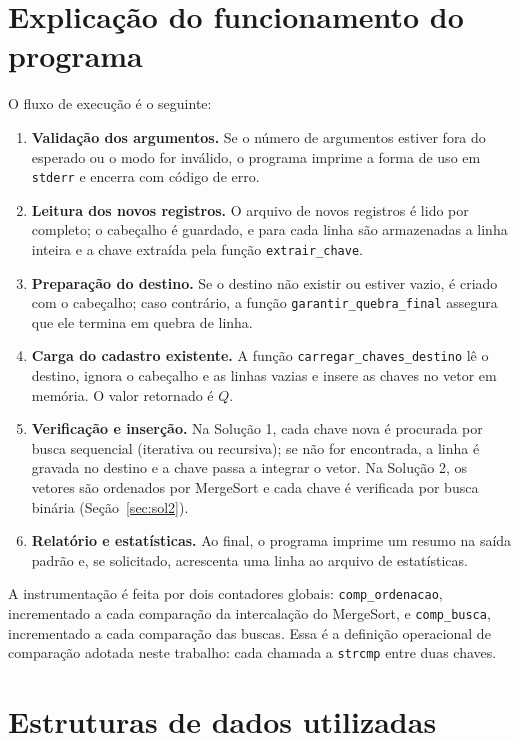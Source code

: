 \documentclass[11pt,a4paper]{article}
\begin{document}
\section{Explicação do funcionamento do programa}

O fluxo de execução é o seguinte:
\begin{enumerate}[itemsep=2pt]
  \item \textbf{Validação dos argumentos.} Se o número de argumentos estiver fora do esperado ou o modo for inválido, o programa imprime a forma de uso em \texttt{stderr} e encerra com código de erro.
  \item \textbf{Leitura dos novos registros.} O arquivo de novos registros é lido por completo; o cabeçalho é guardado, e para cada linha são armazenadas a linha inteira e a chave extraída pela função \texttt{extrair\_chave}.
  \item \textbf{Preparação do destino.} Se o destino não existir ou estiver vazio, é criado com o cabeçalho; caso contrário, a função \texttt{garantir\_quebra\_final} assegura que ele termina em quebra de linha.
  \item \textbf{Carga do cadastro existente.} A função \texttt{carregar\_chaves\_destino} lê o destino, ignora o cabeçalho e as linhas vazias e insere as chaves no vetor em memória. O valor retornado é $Q$.
  \item \textbf{Verificação e inserção.} Na Solução 1, cada chave nova é procurada por busca sequencial (iterativa ou recursiva); se não for encontrada, a linha é gravada no destino e a chave passa a integrar o vetor. Na Solução 2, os vetores são ordenados por MergeSort e cada chave é verificada por busca binária (Seção~\ref{sec:sol2}).
  \item \textbf{Relatório e estatísticas.} Ao final, o programa imprime um resumo na saída padrão e, se solicitado, acrescenta uma linha ao arquivo de estatísticas.
\end{enumerate}

A instrumentação é feita por dois contadores globais: \texttt{comp\_ordenacao}, incrementado a cada comparação da intercalação do MergeSort, e \texttt{comp\_busca}, incrementado a cada comparação das buscas. Essa é a definição operacional de comparação adotada neste trabalho: cada chamada a \texttt{strcmp} entre duas chaves.

\section{Estruturas de dados utilizadas}
\end{document}
